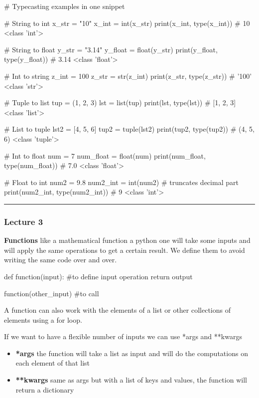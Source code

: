 \begin{pythoncode}
    # Typecasting examples in one snippet

# String to int
x_str = "10"
x_int = int(x_str)
print(x_int, type(x_int))  # 10 <class 'int'>

# String to float
y_str = "3.14"
y_float = float(y_str)
print(y_float, type(y_float))  # 3.14 <class 'float'>

# Int to string
z_int = 100
z_str = str(z_int)
print(z_str, type(z_str))  # '100' <class 'str'>

# Tuple to list
tup = (1, 2, 3)
lst = list(tup)
print(lst, type(lst))  # [1, 2, 3] <class 'list'>

# List to tuple
lst2 = [4, 5, 6]
tup2 = tuple(lst2)
print(tup2, type(tup2))  # (4, 5, 6) <class 'tuple'>

# Int to float
num = 7
num_float = float(num)
print(num_float, type(num_float))  # 7.0 <class 'float'>

# Float to int
num2 = 9.8
num2_int = int(num2)  # truncates decimal part
print(num2_int, type(num2_int))  # 9 <class 'int'>

\end{pythoncode}

\hrule

\subsubsection{Lecture 3}

\textbf{Functions} \ra like a mathematical function a python one will take some inputs and will apply the same operations to get a certain result. We define them to avoid writing the same code over and over.

\begin{pythoncode}
    def function(input): #to define
        input operation
        return output

    function(other_input) #to call
\end{pythoncode}

\vspace{10pt}

A function can also work with the elements of a list or other collections of elements using a for loop.

\vspace{10pt}

If we want to have a flexible number of inputs we can use *args and **kwargs

\begin{itemize}
    \item \textbf{*args} \ra the function will take a list as input and will do the computations on each element of that list
    \item \textbf{**kwargs} \ra same as args but with a list of keys and values, the function will return a dictionary
\end{itemize}


